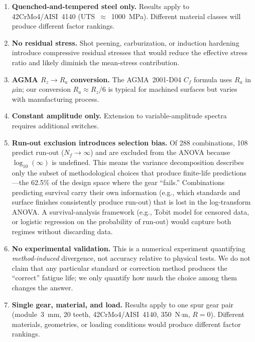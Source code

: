\documentclass[12pt,a4paper]{article}
\begin{document}
\begin{enumerate}
  \item \textbf{Quenched-and-tempered steel only.} Results apply to
        42CrMo4/AISI~4140 (UTS~$\approx$~1000~MPa). Different material
        classes will produce different factor rankings.
  \item \textbf{No residual stress.} Shot peening, carburization, or
        induction hardening introduce compressive residual stresses that
        would reduce the effective stress ratio and likely diminish the
        mean-stress contribution.
  \item \textbf{AGMA $R_z \rightarrow R_a$ conversion.} The AGMA~2001-D04
        $C_f$ formula uses $R_a$ in $\mu$in; our conversion $R_a \approx
        R_z/6$ is typical for machined surfaces but varies with
        manufacturing process.
  \item \textbf{Constant amplitude only.} Extension to variable-amplitude
        spectra requires additional switches.
  \item \textbf{Run-out exclusion introduces selection bias.} Of 288
        combinations, 108 predict run-out ($N_f \rightarrow \infty$) and
        are excluded from the ANOVA because $\log_{10}(\infty)$ is
        undefined. This means the variance decomposition describes only
        the subset of methodological choices that produce finite-life
        predictions---the 62.5\% of the design space where the gear
        ``fails.'' Combinations predicting survival carry their own
        information (e.g., which standards and surface finishes
        consistently produce run-out) that is lost in the log-transform
        ANOVA. A survival-analysis framework (e.g., Tobit model for
        censored data, or logistic regression on the probability of
        run-out) would capture both regimes without discarding data.
  \item \textbf{No experimental validation.} This is a numerical
        experiment quantifying \emph{method-induced} divergence, not
        accuracy relative to physical tests. We do not claim that any
        particular standard or correction method produces the ``correct''
        fatigue life; we only quantify how much the choice among them
        changes the answer.
  \item \textbf{Single gear, material, and load.} Results apply to one
        spur gear pair (module~3~mm, 20 teeth, 42CrMo4/AISI~4140,
        350~N$\cdot$m, $R=0$). Different materials, geometries, or
        loading conditions would produce different factor rankings.
\end{enumerate}
\end{document}
